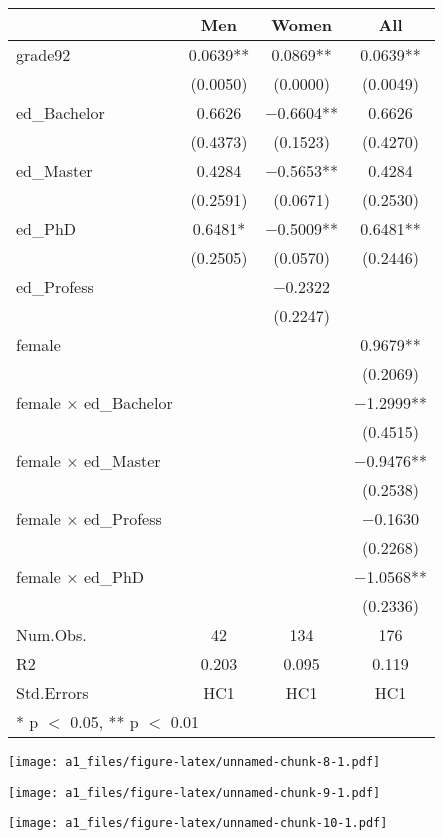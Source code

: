 \documentclass[
]{article}
\begin{document}
\begin{table}

\caption{\label{tab:unnamed-chunk-7}}
\centering
\begin{tabular}[t]{lccc}
\toprule
  & Men & Women & All\\
\midrule
grade92 & \num{0.0639}** & \num{0.0869}** & \num{0.0639}**\\
 & (\num{0.0050}) & (\num{0.0000}) & (\num{0.0049})\\
ed\_Bachelor & \num{0.6626} & \num{-0.6604}** & \num{0.6626}\\
 & (\num{0.4373}) & (\num{0.1523}) & (\num{0.4270})\\
ed\_Master & \num{0.4284} & \num{-0.5653}** & \num{0.4284}\\
 & (\num{0.2591}) & (\num{0.0671}) & (\num{0.2530})\\
ed\_PhD & \num{0.6481}* & \num{-0.5009}** & \num{0.6481}**\\
 & (\num{0.2505}) & (\num{0.0570}) & (\num{0.2446})\\
ed\_Profess &  & \num{-0.2322} & \\
 &  & (\num{0.2247}) & \\
female &  &  & \num{0.9679}**\\
 &  &  & (\num{0.2069})\\
female × ed\_Bachelor &  &  & \num{-1.2999}**\\
 &  &  & (\num{0.4515})\\
female × ed\_Master &  &  & \num{-0.9476}**\\
 &  &  & (\num{0.2538})\\
female × ed\_Profess &  &  & \num{-0.1630}\\
 &  &  & (\num{0.2268})\\
female × ed\_PhD &  &  & \num{-1.0568}**\\
 &  &  & (\num{0.2336})\\
\midrule
Num.Obs. & \num{42} & \num{134} & \num{176}\\
R2 & \num{0.203} & \num{0.095} & \num{0.119}\\
Std.Errors & HC1 & HC1 & HC1\\
\bottomrule
\multicolumn{4}{l}{\rule{0pt}{1em}* p $<$ 0.05, ** p $<$ 0.01}\\
\end{tabular}
\end{table}

\texttt{[image: a1\_files/figure-latex/unnamed-chunk-8-1.pdf]}

\texttt{[image: a1\_files/figure-latex/unnamed-chunk-9-1.pdf]}

\texttt{[image: a1\_files/figure-latex/unnamed-chunk-10-1.pdf]}
\end{document}
